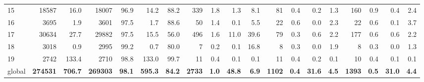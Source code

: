 \begin{tabular}{lrrrrrrrrrrrrrrrrrr}
15 & 18587 & 16.0 & 18007 & 96.9 & 14.2 & 88.2 & 339 & 1.8 & 1.3 & 8.1 & 81 & 0.4 & 0.2 & 1.3 & 160 & 0.9 & 0.4 & 2.4 \\
16 & 3695 & 1.9 & 3601 & 97.5 & 1.7 & 88.6 & 50 & 1.4 & 0.1 & 5.5 & 22 & 0.6 & 0.0 & 2.3 & 22 & 0.6 & 0.1 & 3.7 \\
17 & 30634 & 27.7 & 29882 & 97.5 & 15.5 & 56.0 & 496 & 1.6 & 11.0 & 39.6 & 79 & 0.3 & 0.6 & 2.2 & 177 & 0.6 & 0.6 & 2.2 \\
18 & 3018 & 0.9 & 2995 & 99.2 & 0.7 & 80.0 & 7 & 0.2 & 0.1 & 16.8 & 8 & 0.3 & 0.0 & 1.9 & 8 & 0.3 & 0.0 & 1.3 \\
19 & 2742 & 133.4 & 2710 & 98.8 & 133.0 & 99.7 & 11 & 0.4 & 0.1 & 0.1 & 11 & 0.4 & 0.2 & 0.1 & 10 & 0.4 & 0.1 & 0.1 \\
global & \textbf{274531} & \textbf{706.7} & \textbf{269303} & \textbf{98.1} & \textbf{595.3} & \textbf{84.2} & \textbf{2733} & \textbf{1.0} & \textbf{48.8} & \textbf{6.9} & \textbf{1102} & \textbf{0.4} & \textbf{31.6} & \textbf{4.5} & \textbf{1393} & \textbf{0.5} & \textbf{31.0} & \textbf{4.4} \\
\end{tabular}

